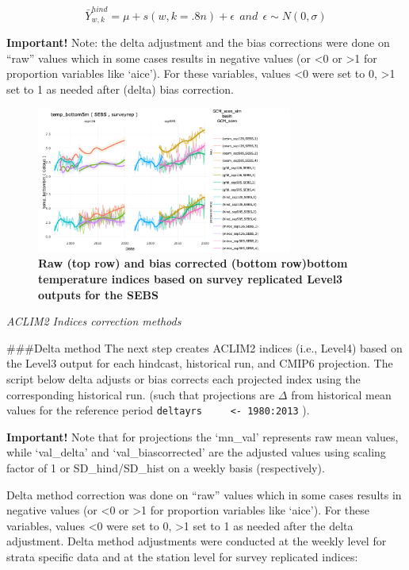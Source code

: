 \documentclass[
]{article}
\begin{document}
\[ \bar{Y}^{hind}_{w,k} = \mu+s(w, k = .8n)+\epsilon~~and~~\epsilon\sim N(0,\sigma)\]

\textbf{Important!} Note: the delta adjustment and the bias corrections
were done on ``raw'' values which in some cases results in negative
values (or \textless0 or \textgreater1 for proportion variables like
`aice'). For these variables, values \textless0 were set to 0,
\textgreater1 set to 1 as needed after (delta) bias correction.

\begin{figure}
\centering
\includegraphics[width=0.75\textwidth,height=\textheight]{Figs/biascorrected_temp2.png}
\caption{\textbf{Raw (top row) and bias corrected (bottom row)bottom
temperature indices based on survey replicated Level3 outputs for the
SEBS}}
\end{figure}

\emph{ACLIM2 Indices correction methods}

\#\#\#Delta method The next step creates ACLIM2 indices (i.e., Level4)
based on the Level3 output for each hindcast, historical run, and CMIP6
projection. The script below delta adjusts or bias corrects each
projected index using the corresponding historical run. (such that
projections are \(\Delta\) from historical mean values for the reference
period \texttt{deltayrs\ \ \ \ \ \textless{}-\ 1980:2013} ).

\textbf{Important!} Note that for projections the `mn\_val' represents
raw mean values, while `val\_delta' and `val\_biascorrected' are the
adjusted values using scaling factor of 1 or SD\_hind/SD\_hist on a
weekly basis (respectively).

Delta method correction was done on ``raw'' values which in some cases
results in negative values (or \textless0 or \textgreater1 for
proportion variables like `aice'). For these variables, values
\textless0 were set to 0, \textgreater1 set to 1 as needed after the
delta adjustment. Delta method adjustments were conducted at the weekly
level for strata specific data and at the station level for survey
replicated indices:
\end{document}
